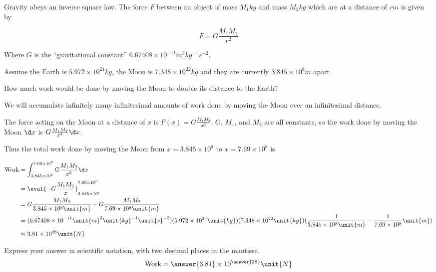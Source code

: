 \documentclass{ximera}
\author{Steven Gubkin}
\begin{document}
\begin{exercise}


Gravity obeys an inverse square law.  The force $F$ between an object of mass $M_1 \unit{kg}$ and mass $M_2 \unit{kg} $ which are at a distance of $r \unit{m}$ is given by 

\[
F = G\frac{M_1M_2}{r^2}
\]

Where $G$ is the ``gravitational constant'' $6.67408 \times 10^{-11} \unit{m}^3 \unit{kg}^{-1} \unit{s}^{-2}$.

Assume the Earth is $5.972 \times 10^{24} \unit{kg}$, the Moon is $7.348 \times 10^{22} \unit{kg}$ and they are currently $3.845 \times 10^8 \unit{m}$ apart.

How much work would be done by moving the Moon to double its distance to the Earth?

\begin{hint}
We will accumulate infinitely many infinitesimal amounts of work done by moving the Moon over an infinitesimal distance. 
\end{hint}

\begin{hint}
The force acting on the Moon at a distance of $x$ is $F(x) = G \frac{M_1M_2}{x^2}$.  $G$, $M_1$, and $M_2$ are all constants, so the work done by moving the Moon $\d x$ is $G \frac{M_1M_2}{x^2} \d x$.
\end{hint}

\begin{hint}
Thus the total work done by moving the Moon from $x = 3.845 \times 10^8$ to $x = 7.69 \times 10^8$ is

\begin{align*}
\textrm{Work} &= \int_{3.845 \times 10^8}^{7.69 \times 10^8} G \frac{M_1M_2}{x^2} \d x\\
		&= \eval{-G\frac{M_1M_2}{x}}_{3.845 \times 10^8}^{7.69 \times 10^8}\\
		&=G\frac{M_1M_2}{3.845 \times 10^8 \unit{m}} - G\frac{M_1M_2}{7.69 \times 10^8 \unit{m}}\\
		&= (6.67408 \times 10^{-11} \unit{m}^3 \unit{kg}^{-1} \unit{s}^{-2})(5.972 \times 10^{24} \unit{kg})(7.348 \times 10^{22} \unit{kg})(\frac{1}{3.845 \times 10^8 \unit{m}} - \frac{1}{7.69 \times 10^8} \unit{m})\\
		&\approx 3.81 \times 10^{28} \unit{N}
\end{align*}
\end{hint}


\begin{prompt}
Express your answer in scientific notation, with two decimal places in the mantissa.
	\[
	\textrm{Work} = \answer{3.81} \times 10^{\answer{28}} \unit{N}
	\]
\end{prompt}
\end{exercise}
\end{document}

